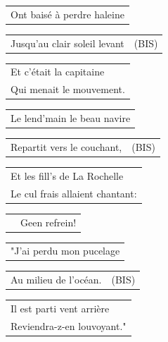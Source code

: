 \documentclass[a4paper, 14pt]{extarticle}
\begin{document}
\begin{flushleft}
\begin{tabularx}{\textwidth} {
    >{\raggedright\arraybackslash}X}
Ont baisé à perdre haleine\\
\end{tabularx}
\begin{tabularx}{\textwidth} {
    >{\raggedright\arraybackslash}X|c}
Jusqu’au clair soleil levant & (BIS)\\
\end{tabularx}
\begin{tabularx}{\textwidth} {
    >{\raggedright\arraybackslash}X}
Et c’était la capitaine \\
Qui menait le mouvement. \\
\end{tabularx}
\end{flushleft}
\begin{flushleft}
\begin{tabularx}{\textwidth} {
    >{\raggedright\arraybackslash}X}
Le lend’main le beau navire\\
\end{tabularx}
\begin{tabularx}{\textwidth} {
    >{\raggedright\arraybackslash}X|c}
Repartit vers le couchant, & (BIS)\\
\end{tabularx}
\begin{tabularx}{\textwidth} {
    >{\raggedright\arraybackslash}X}
Et les fill’s de La Rochelle \\
Le cul frais allaient chantant:\\
\end{tabularx}
\end{flushleft}
\begin{flushleft}
\begin{tabularx}{\textwidth} {
    c >{\raggedright\arraybackslash}X}
\hspace{5mm} & {\small Geen refrein!}
\end{tabularx}
\end{flushleft}
\begin{flushleft}
\begin{tabularx}{\textwidth} {
    >{\raggedright\arraybackslash}X}
"J’ai perdu mon pucelage\\
\end{tabularx}
\begin{tabularx}{\textwidth} {
    >{\raggedright\arraybackslash}X|c}
Au milieu de l’océan. & (BIS)\\
\end{tabularx}
\begin{tabularx}{\textwidth} {
    >{\raggedright\arraybackslash}X}
Il est parti vent arrière \\
Reviendra-z-en louvoyant." \\
\end{tabularx}
\end{flushleft}
\end{document}
